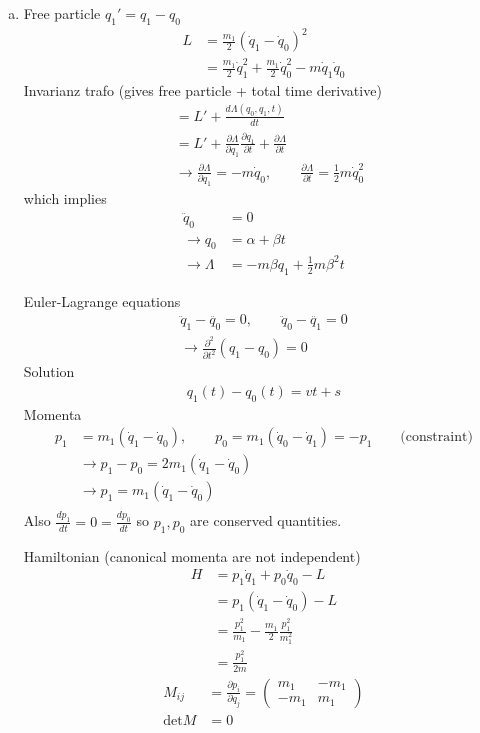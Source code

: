 \documentclass[10pt,a4paper]{report}
\theoremstyle{definition}
\begin{document}
\begin{enumerate}[a)]
\item Free particle $q_1'=q_1-q_0$
\begin{align}
L&=\frac{m_1}{2}(\dot{q}_1-\dot{q}_0)^2\\
&=\frac{m_1}{2}\dot{q}_1^2+\frac{m_1}{2}\dot{q}_0^2-m\dot{q}_1\dot{q}_0
\end{align}
Invarianz trafo (gives free particle + total time derivative)
\begin{align}
&=L'+\frac{d\Lambda(q_0,q_1,t)}{dt}\\
&=L'+\frac{\partial\Lambda}{\partial q_1}\frac{\partial q_1}{\partial t}+\frac{\partial\Lambda}{\partial t}\\
&\rightarrow \frac{\partial\Lambda}{\partial q_1}=-m\dot{q}_0,\qquad \frac{\partial\Lambda}{\partial t}=\frac{1}{2}m\dot{q}_0^2
\end{align}
which implies
\begin{align}
\ddot{q}_0&=0\\
\rightarrow q_0&=\alpha+\beta t\\
\rightarrow \Lambda&=-m\beta q_1+\frac{1}{2}m\beta^2t
\end{align}


Euler-Lagrange equations
\begin{align}
\ddot{q}_1-\ddot{q_0}=0,\qquad\ddot{q}_0-\ddot{q_1}=0\\
\rightarrow \frac{\partial^2}{\partial t^2}(q_1-q_0)=0
\end{align}
Solution
\begin{align}
q_1(t)-q_0(t)=vt+s
\end{align}
Momenta
\begin{align}
p_1&=m_1(\dot{q}_1-\dot{q}_0),\qquad p_0=m_1(\dot{q}_0-\dot{q}_1)=-p_1\qquad\text{(constraint)}\\
&\rightarrow p_1-p_0=2m_1(\dot{q}_1-\dot{q}_0)\\
&\rightarrow p_1=m_1(\dot{q}_1-\dot{q}_0)\\
\end{align}
Also $\frac{dp_1}{dt}=0=\frac{dp_0}{dt}$ so $p_1, p_0$ are conserved quantities.


Hamiltonian (canonical momenta are not independent)
\begin{align}
H&=p_1\dot{q}_1+p_0\dot{q}_0-L\\
&=p_1(\dot{q}_1-\dot{q}_0)-L\\
&=\frac{p_1^2}{m_1}-\frac{m_1}{2}\frac{p_1^2}{m_1^2}\\
&=\frac{p_1^2}{2m}
\end{align}
\begin{align}
M_{ij}&=\frac{\partial p_i}{\partial \dot{q}_j}=\left(\begin{array}{cc}
m_1 & -m_1\\
-m_1 & m_1
\end{array}\right)\\
\text{det}M&=0
\end{align}


\end{enumerate}
\end{document}
